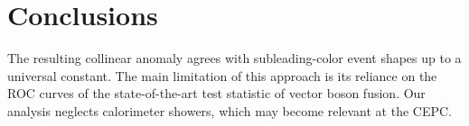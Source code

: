 \section{Conclusions}\label{sec:conclusions}

The resulting collinear anomaly agrees with subleading-color event
shapes up to a universal constant. The main limitation of this approach
is its reliance on the ROC curves of the state-of-the-art test statistic
of vector boson fusion. Our analysis neglects calorimeter showers, which
may become relevant at the CEPC.

